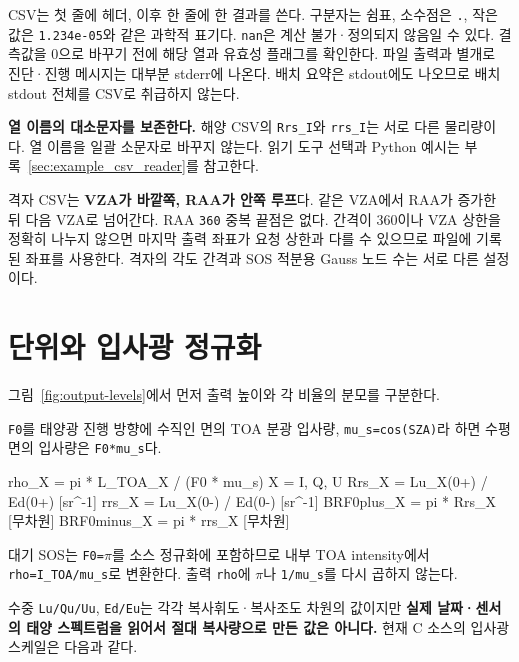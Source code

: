 CSV는 첫 줄에 헤더, 이후 한 줄에 한 결과를 쓴다. 구분자는 쉼표, 소수점은 \texttt{.\allowbreak{}}, 작은 값은 \texttt{1.\allowbreak{}234e-\allowbreak{}05}와 같은 과학적 표기다. \texttt{nan}은 계산 불가·정의되지 않음일 수 있다. 결측값을 0으로 바꾸기 전에 해당 열과 유효성 플래그를 확인한다. 파일 출력과 별개로 진단·진행 메시지는 대부분 stderr에 나온다. 배치 요약은 stdout에도 나오므로 배치 stdout 전체를 CSV로 취급하지 않는다.

\textbf{열 이름의 대소문자를 보존한다.} 해양 CSV의 \texttt{Rrs\_\allowbreak{}I}와 \texttt{rrs\_\allowbreak{}I}는 서로 다른 물리량이다. 열 이름을 일괄 소문자로 바꾸지 않는다. 읽기 도구 선택과 Python 예시는 부록~\ref{sec:example_csv_reader}를 참고한다.

격자 CSV는 \textbf{VZA가 바깥쪽, RAA가 안쪽 루프}다. 같은 VZA에서 RAA가 증가한 뒤 다음 VZA로 넘어간다. RAA \texttt{360\textdegree{}} 중복 끝점은 없다. 간격이 360이나 VZA 상한을 정확히 나누지 않으면 마지막 출력 좌표가 요청 상한과 다를 수 있으므로 파일에 기록된 좌표를 사용한다. 격자의 각도 간격과 SOS 적분용 Gauss 노드 수는 서로 다른 설정이다.

\Needspace{0.60\textheight}
\section{단위와 입사광 정규화}
\label{sec:auto:05_output_formats:2}
그림~\ref{fig:output-levels}에서 먼저 출력 높이와 각 비율의 분모를 구분한다.

\FloatBarrier
\texttt{F0}를 태양광 진행 방향에 수직인 면의 TOA 분광 입사량, \texttt{mu\_\allowbreak{}s=\allowbreak{}cos(SZA)}라 하면 수평면의 입사량은 \texttt{F0*mu\_\allowbreak{}s}다.


\begin{ManualCode}
rho_X = pi * L_TOA_X / (F0 * mu_s)          X = I, Q, U
Rrs_X = Lu_X(0+) / Ed(0+)                  [sr^-1]
rrs_X = Lu_X(0-) / Ed(0-)                  [sr^-1]
BRF0plus_X  = pi * Rrs_X                   [무차원]
BRF0minus_X = pi * rrs_X                   [무차원]
\end{ManualCode}

대기 SOS는 \texttt{F0=\allowbreak{}\ensuremath{\pi}}를 소스 정규화에 포함하므로 내부 TOA intensity에서 \texttt{rho=\allowbreak{}I\_\allowbreak{}TOA/\allowbreak{}mu\_\allowbreak{}s}로 변환한다. 출력 \texttt{rho}에 \ensuremath{\pi}나 \texttt{1/\allowbreak{}mu\_\allowbreak{}s}를 다시 곱하지 않는다.

수중 \texttt{Lu/\allowbreak{}Qu/\allowbreak{}Uu}, \texttt{Ed/\allowbreak{}Eu}는 각각 복사휘도·복사조도 차원의 값이지만 \textbf{실제 날짜·센서의 태양 스펙트럼을 읽어서 절대 복사량으로 만든 값은 아니다.} 현재 C 소스의 입사광 스케일은 다음과 같다.


